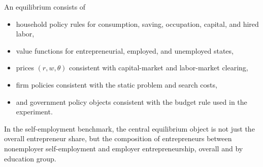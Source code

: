An equilibrium consists of
\begin{itemize}
\item household policy rules for consumption, saving, occupation, capital, and
hired labor,
\item value functions for entrepreneurial, employed, and unemployed states,
\item prices $(r,w,\theta)$ consistent with capital-market and labor-market
clearing,
\item firm policies consistent with the static problem and search costs,
\item and government policy objects consistent with the budget rule used in the
experiment.
\end{itemize}

In the self-employment benchmark, the central equilibrium object is not just the
overall entrepreneur share, but the composition of entrepreneurs between
nonemployer self-employment and employer entrepreneurship, overall and by
education group.
